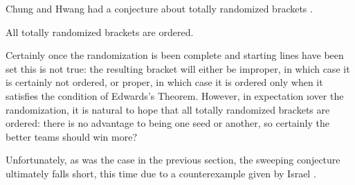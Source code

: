 {    Chung and Hwang had a conjecture about totally randomized brackets \cite{define_ordered}.
    
    \begin{conj}{}{}
        All totally randomized brackets are ordered.
    \end{conj}

    Certainly once the randomization is been complete and starting lines have been set this is not true: the resulting bracket will either be improper, in which case it is certainly not ordered, or proper, in which case it is ordered only when it satisfies the condition of Edwards's Theorem. However, in expectation \i{over the randomization}, it is natural to hope that all totally randomized brackets are ordered: there is no advantage to being one seed or another, so certainly the better teams should win more?

    Unfortunately, as was the case in the previous section, the sweeping conjecture ultimately falls short, this time due to a counterexample given by Israel \cite{seventeen_team}.

    }
